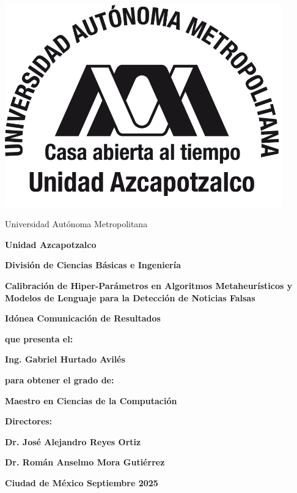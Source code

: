 \thispagestyle{empty}

\begin{minipage}{0.18\textwidth}
	\includegraphics[width=0.9\textwidth]{./Imagenes/uam.png}
\end{minipage}%
\begin{minipage}{0.82\textwidth}
\begin{center}
	\large \sc Universidad Autónoma Metropolitana
\end{center}
\end{minipage}

\vspace{0.5cm}
\centerline{\Large \bf Unidad Azcapotzalco}
\vspace{0.5cm}
\centerline{\Large \bf División de Ciencias Básicas e Ingeniería}

\begin{center}
\Large \bf
Calibración de Hiper-Parámetros en Algoritmos Metaheurísticos y Modelos de Lenguaje para la Detección de Noticias Falsas
\end{center}

\centerline{\Large \bf Idónea Comunicación de Resultados}

\vspace{0.8cm}
\centerline{\large \bf que presenta el:}
\vspace{0.3cm}
\centerline{\Large \bf Ing. Gabriel Hurtado Avilés}
\vspace{0.5cm}
\centerline{\large \bf para obtener el grado de:}
\vspace{0.3cm}
\centerline{\Large \bf Maestro en Ciencias de la Computación}
\vspace{1.2cm}
\centerline{\Large \bf Directores:}
\vspace{0.5cm}
\centerline{\Large \bf Dr. José Alejandro Reyes Ortiz}
\vspace{0.3cm}
\centerline{\Large \bf Dr. Román Anselmo Mora Gutiérrez}
 
\vspace{1.2cm}
{\large \bf Ciudad de México \hfill Septiembre 2025}